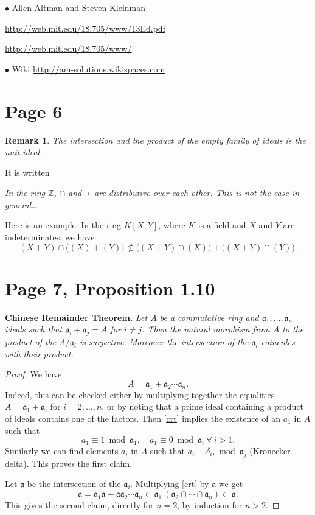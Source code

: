 \documentclass[parskip=half]{scrartcl}%
\newcommand{\mf}{\mathfrak}
\newcommand{\aaa}{\mf a}
\newcommand{\bu}{\bullet}
\newtheorem{rk}[thm]{Remark}
\begin{document}
$\bu$ Allen Altman and Steven Kleinman %

\href{http://web.mit.edu/18.705/www/13Ed.pdf}{http://web.mit.edu/18.705/www/13Ed.pdf}

\href{http://web.mit.edu/18.705/www/}{http://web.mit.edu/18.705/www/}

$\bu$ Wiki \href{http://am-solutions.wikispaces.com}{http://am-solutions.wikispaces.com}

\section{Page 6}%

\begin{rk}\label{ef}
The intersection and the product of the empty family of ideals is the unit ideal.
\end{rk}

It is written

\emph{In the ring $\mathbb Z$, $\cap$ and + are distributive over each other. This is not the case in general\dots}

Here is an example: In the ring $K[X,Y]$, where $K$ is a field and $X$ and $Y$ are indeterminates, we have 
$$
(X+Y)\cap\Big((X)+(Y)\Big)\not\subset\Big((X+Y)\cap (X)\Big)+\Big((X+Y)\cap (Y)\Big).
$$

\section{Page 7, Proposition 1.10}%

\textbf{Chinese Remainder Theorem.} \emph{Let $A$ be a commutative ring and $\aaa_1,\dots,\aaa_n$ ideals such that $\aaa_i+\aaa_j=A$ for $i\not=j$. Then the natural morphism from $A$ to the product of the $A/\aaa_i$ is surjective. Moreover the intersection of the $\aaa_i$ coincides with their product.}

\begin{proof} 
We have
\begin{equation}\label{crt}
A=\aaa_1+\aaa_2\cdots\aaa_n.
\end{equation}
Indeed, this can be checked either by multiplying together the equalities $A=\aaa_1+\aaa_i$ for $i=2,\dots,n$, or by noting that a prime ideal containing a product of ideals contains one of the factors. Then \eqref{crt} implies the existence of an $a_1$ in $A$ such that
$$
a_1\equiv1\bmod\aaa_1,\quad a_1\equiv0\bmod \aaa_i\ \forall\ i > 1.
$$
Similarly we can find elements $a_i$ in $A$ such that $a_i\equiv\delta_{ij}\bmod \aaa_j$ (Kronecker delta). This proves the first claim.

Let $\aaa$ be the intersection of the $\aaa_i$. Multiplying \eqref{crt} by $\aaa$ we get
$$
\aaa=
\aaa_1\aaa+
\aaa\aaa_2\cdots\aaa_n\subset
\aaa_1\ (\aaa_2\cap\cdots \cap \aaa_n)\subset \aaa.
$$
This gives the second claim, directly for $n=2$, by induction for $n>2$. 
\end{proof}
\end{document}
